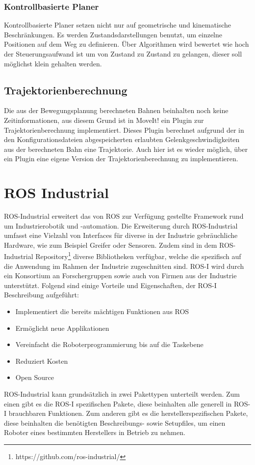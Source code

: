 \subsubsection{Kontrollbasierte Planer}
Kontrollbasierte Planer setzen nicht nur auf geometrische und kinematische Beschränkungen. Es werden Zustandsdarstellungen benutzt, um einzelne Positionen auf dem Weg zu definieren. Über Algorithmen wird bewertet wie hoch der Steuerungsaufwand ist um von Zustand zu Zustand zu gelangen, dieser soll möglichst klein gehalten werden. \cite{Availabl94:online}

\subsection{Trajektorienberechnung}
Die aus der Bewegungsplanung berechneten Bahnen beinhalten noch keine Zeitinformationen, aus diesem Grund ist in MoveIt! ein Plugin zur Trajektorienberechnung implementiert. Dieses Plugin berechnet aufgrund der in den Konfigurationsdateien abgespeicherten erlaubten Gelenkgeschwindigkeiten aus der berechneten Bahn eine Trajektorie. Auch hier ist es wieder möglich, über ein Plugin eine eigene Version der Trajektorienberechnung zu implementieren. \cite{Chitta2016}

\section{ROS Industrial}
ROS-Industrial erweitert das von ROS zur Verfügung gestellte Framework rund um Industrierobotik und -automation. Die Erweiterung durch ROS-Industrial umfasst eine Vielzahl von Interfaces für diverse in der Industrie gebräuchliche Hardware, wie zum Beispiel Greifer oder Sensoren. Zudem sind in dem ROS-Industrial Repository\footnote{https://github.com/ros-industrial/} diverse Bibliotheken verfügbar, welche die spezifisch auf die Anwendung im Rahmen der Industrie zugeschnitten sind. ROS-I wird durch ein Konsortium\cite{ROS-IMembers} an Forschergruppen sowie auch von Firmen aus der Industrie unterstützt.
Folgend sind einige Vorteile und Eigenschaften, der ROS-I Beschreibung aufgeführt:\cite{Descript37:online}
\begin{itemize}
	\itemsep0pt
	\item Implementiert die bereits mächtigen Funktionen aus ROS
	\item Ermöglicht neue Applikationen
	\item Vereinfacht die Roboterprogrammierung bis auf die Taskebene
	\item Reduziert Kosten
	\item Open Source
\end{itemize}
ROS-Industrial kann grundsätzlich in zwei Pakettypen unterteilt werden. Zum einen gibt es die ROS-I spezifischen Pakete, diese beinhalten alle generell in ROS-I brauchbaren Funktionen. Zum anderen gibt es die herstellerspezifischen Pakete, diese beinhalten die benötigten Beschreibungs- sowie Setupfiles, um einen Roboter eines bestimmten Herstellers in Betrieb zu nehmen. 
